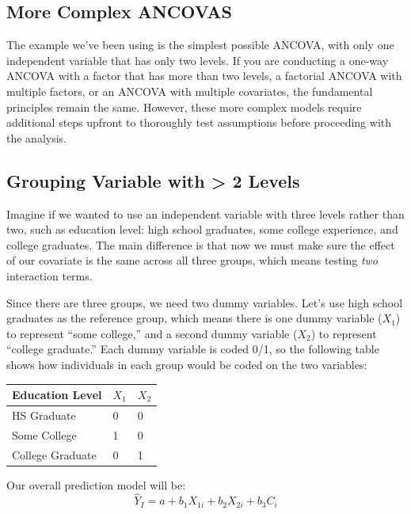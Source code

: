 \documentclass[
  letterpaper,
  DIV=11,
  numbers=noendperiod]{scrreprt}
\begin{document}
\subsection{More Complex ANCOVAS}\label{more-complex-ancovas}

The example we've been using is the simplest possible ANCOVA, with only
one independent variable that has only two levels. If you are conducting
a one-way ANCOVA with a factor that has more than two levels, a
factorial ANCOVA with multiple factors, or an ANCOVA with multiple
covariates, the fundamental principles remain the same. However, these
more complex models require additional steps upfront to thoroughly test
assumptions before proceeding with the analysis.

\subsection*{Grouping Variable with \textgreater{} 2
Levels}\label{grouping-variable-with-2-levels}

Imagine if we wanted to use an independent variable with three levels
rather than two, such as education level: high school graduates, some
college experience, and college graduates. The main difference is that
now we must make sure the effect of our covariate is the same across all
three groups, which means testing \emph{two} interaction terms.

Since there are three groups, we need two dummy variables. Let's use
high school graduates as the reference group, which means there is one
dummy variable (\(X_1\)) to represent ``some college,'' and a second
dummy variable (\(X_2\)) to represent ``college graduate.'' Each dummy
variable is coded 0/1, so the following table shows how individuals in
each group would be coded on the two variables:

\begin{longtable}[]{@{}lll@{}}
\toprule\noalign{}
Education Level & \(X_1\) & \(X_2\) \\
\midrule\noalign{}
\endhead
\bottomrule\noalign{}
\endlastfoot
HS Graduate & 0 & 0 \\
Some College & 1 & 0 \\
College Graduate & 0 & 1 \\
\end{longtable}

Our overall prediction model will be:\\
\[
\hat{Y}_I = a + b_1X_{1i} + b_2X_{2i}+ b_3C_i 
\]
\end{document}
